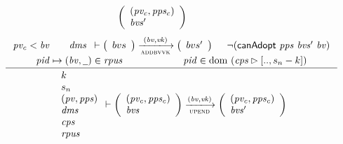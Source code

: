 \begin{figure}[htb]
\begin{equation}
{      {
        \left(
          \begin{array}{l}
            (\mathit{pv_c}, \mathit{pps_c})\\
            \mathit{bvs'}
          \end{array}
        \right)
      }
    }
  \end{equation}
  \nextdef
  \begin{equation}
    \label{eq:rule:up-no-adoption}
    \inference
    {
      \var{pv_c} < \var{bv}
      &
      {
        \begin{array}{l}
          \var{dms}
        \end{array}
      }
      \vdash
      {
        \left(
          \begin{array}{l}
            bvs
          \end{array}
        \right)
      }
      \trans{addbvvk}{(\var{bv}, \var{vk})}
      {
        \left(
          \begin{array}{l}
            bvs'
          \end{array}
        \right)
      }
      & \neg (\fun{canAdopt}~\var{pps}~\var{bvs'}~\var{bv})\\
      \var{pid} \mapsto (\var{bv}, \wcard) \in \var{rpus}
      & \var{pid} \in \dom~(\var{cps} \restrictrange [.., s_n - k])
    }
    {
      {
        \begin{array}{l}
          k\\
          s_n\\
          (\var{pv}, \var{pps})\\
          \var{dms}\\
          \var{cps}\\
          \var{rpus}
        \end{array}
      }
      \vdash
      {
        \left(
          \begin{array}{l}
            (\var{pv_c}, \var{pps_c})\\
            \var{bvs}
          \end{array}
        \right)
      }
      \trans{upend}{(\var{bv}, \var{vk})}
      {
        \left(
          \begin{array}{l}
            (\var{pv_c}, \var{pps_c})\\
            \var{bvs'}
          \end{array}
        \right)
      }
    }
  \end{equation}
  \nextdef
  \begin{equation}
    \label{eq:rule:up-adoption}

\end{equation}
\end{figure}
